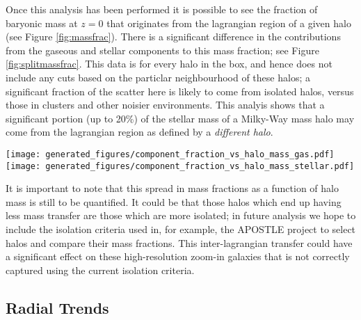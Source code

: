 Once this analysis has been performed it is possible to see the fraction of
baryonic mass at $z=0$ that originates from the lagrangian region of a given
halo (see Figure \ref{fig:massfrac}). There is a significant difference in the
contributions from the gaseous and stellar components to this mass fraction;
see Figure \ref{fig:splitmassfrac}. This data is for every halo in the box, and
hence does not include any cuts based on the particlar neighbourhood of these
halos; a significant fraction of the scatter here is likely to come from
isolated halos, versus those in clusters and other noisier environments. This
analyis shows that a significant portion (up to 20\%) of the stellar mass of a
Milky-Way mass halo may come from the lagrangian region as defined by a
\emph{different halo}.

\begin{figure*} \centering
	\texttt{[image: generated\_figures/component\_fraction\_vs\_halo\_mass\_gas.pdf]}
	\texttt{[image: generated\_figures/component\_fraction\_vs\_halo\_mass\_stellar.pdf]}
	\caption{Left: fraction of gaseous mass at $z=0$ in each halo from each
	component; right: fraction of stellar mass at $z=0$ from each
	component. Note that there is significantly more transfer shown in the
	gaseous component. Gas that is transferred between lagrangian regions
	must be given time to cool before being able to form stars. As the
	events that enable transfer are typically very energetic (AGN, stellar
	feedback, accretion), it is unlikely that the cooling time will be
	short enough to form stars by the end of the simulation for most
	transfer.} \label{fig:splitmassfrac} \end{figure*}

It is important to note that this spread in mass fractions as a function of
halo mass is still to be quantified. It could be that those halos which
end up having less mass transfer are those which are more isolated; in future
analysis we hope to include the isolation criteria used in, for example, the
APOSTLE project \citep{fattahi2016} to select halos and compare their mass
fractions. This inter-lagrangian transfer could have a significant effect
on these high-resolution zoom-in galaxies that is not correctly captured
using the current isolation criteria.

\subsection{Radial Trends}

